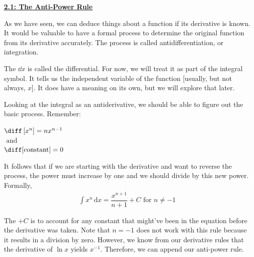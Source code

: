 \textbf{\underline{\large{2.1: The Anti-Power Rule }}} \par

As we have seen, we can deduce things about a function if its derivative is known. It would be valuable to have a formal process to determine the original function from its derivative accurately. The process is called antidifferentiation, or integration. \par

\begin{center}  
\end{center}

The $\dd x$ is called the differential. For now, we will treat it as part of the integral symbol. It tells us the independent variable of the function [usually, but not always, $x$]. It does have a meaning on its own, but we will explore that later. \par

Looking at the integral as an antiderivative, we should be able to figure out the basic process. Remember: \begin{center}
    $\diff \left[x^n\right] = nx^{n - 1}$ \\[11pt]
    $\text{ and }$ \\[11pt]
   $ \diff [\text{constant}] = 0$ \\[11pt]
\end{center}

It follows that if we are starting with the derivative and want to reverse the process, the power must increase by one and we should divide by this new power. Formally, \begin{align*}
    \int x^n \,\mathrm{d}x = \dfrac{x^{n + 1}}{n + 1} + C \text{ for } n \neq -1
\end{align*}

The $+C$ is to account for any constant that might've been in the equation before the derivative was taken. Note that $n = -1$ does not work with this rule because it results in a division by zero. However, we know from our derivative rules that the derivative of $\ln x$ yields $x^{-1}$. Therefore, we can append our anti-power rule. \par


